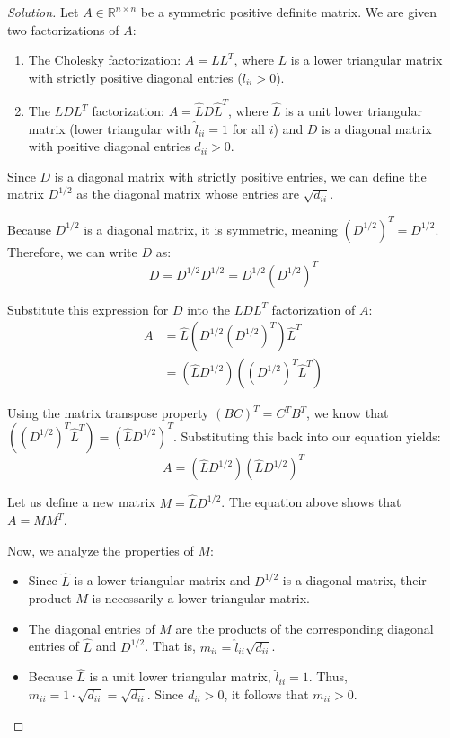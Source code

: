 \documentclass[11pt, a4paper]{article}
\newcommand{\R}{\mathbb{R}}
\newif\ifsolutionnewpage
\newenvironment{solution}
  {\begin{proof}[Solution]}
  {\end{proof}\ifsolutionnewpage\newpage\fi}
\begin{document}
\begin{solution}
    Let $A \in \R^{n \times n}$ be a symmetric positive definite matrix. We are given two factorizations of $A$:
    \begin{enumerate}
        \item The Cholesky factorization: $A = LL^T$, where $L$ is a lower triangular matrix with strictly positive diagonal entries ($l_{ii} > 0$).
        \item The $LDL^T$ factorization: $A = \hat{L}D\hat{L}^T$, where $\hat{L}$ is a unit lower triangular matrix (lower triangular with $\hat{l}_{ii} = 1$ for all $i$) and $D$ is a diagonal matrix with positive diagonal entries $d_{ii} > 0$.
    \end{enumerate}

    Since $D$ is a diagonal matrix with strictly positive entries, we can define the matrix $D^{1/2}$ as the diagonal matrix whose entries are $\sqrt{d_{ii}}$. 
    
    Because $D^{1/2}$ is a diagonal matrix, it is symmetric, meaning $(D^{1/2})^T = D^{1/2}$. Therefore, we can write $D$ as:
    \[
    D = D^{1/2} D^{1/2} = D^{1/2} (D^{1/2})^T
    \]

    Substitute this expression for $D$ into the $LDL^T$ factorization of $A$:
    \begin{align*}
        A &= \hat{L} \left( D^{1/2} (D^{1/2})^T \right) \hat{L}^T \\
        &= (\hat{L} D^{1/2}) ( (D^{1/2})^T \hat{L}^T )
    \end{align*}

    Using the matrix transpose property $(BC)^T = C^T B^T$, we know that $( (D^{1/2})^T \hat{L}^T ) = (\hat{L} D^{1/2})^T$. Substituting this back into our equation yields:
    \[
    A = (\hat{L} D^{1/2}) (\hat{L} D^{1/2})^T
    \]

    Let us define a new matrix $M = \hat{L} D^{1/2}$. The equation above shows that $A = MM^T$. 
    
    Now, we analyze the properties of $M$:
    \begin{itemize}
        \item Since $\hat{L}$ is a lower triangular matrix and $D^{1/2}$ is a diagonal matrix, their product $M$ is necessarily a lower triangular matrix.
        \item The diagonal entries of $M$ are the products of the corresponding diagonal entries of $\hat{L}$ and $D^{1/2}$. That is, $m_{ii} = \hat{l}_{ii} \sqrt{d_{ii}}$.
        \item Because $\hat{L}$ is a unit lower triangular matrix, $\hat{l}_{ii} = 1$. Thus, $m_{ii} = 1 \cdot \sqrt{d_{ii}} = \sqrt{d_{ii}}$. Since $d_{ii} > 0$, it follows that $m_{ii} > 0$.
    \end{itemize}


\end{solution}
\end{document}
